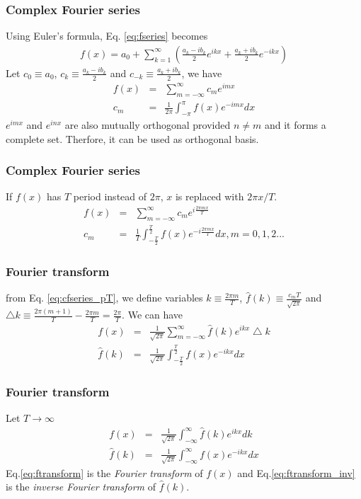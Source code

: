 \documentclass{beamer}
\begin{document}
\begin{frame}
\frametitle{Complex Fourier series}
Using Euler's formula, Eq. \ref{eq:fseries} becomes 
\begin{eqnarray}
f(x)=a_0 + \sum_{k=1}^{\infty} \left(\frac{a_k - ib_k}{2} e^{ikx} + \frac{a_k + ib_k}{2}e^{-ikx}\right) \nonumber
\end{eqnarray}
Let $c_0 \equiv a_0$, $c_k \equiv \frac{a_k - ib_k}{2}$ and $c_{-k} \equiv \frac{a_k + ib_k}{2}$, we have
\begin{eqnarray}
f(x)&=&\sum_{m=-\infty}^{\infty} c_m e^{imx} \nonumber \\
c_m&=&\frac{1}{2\pi}\int_{-\pi}^{\pi} f(x) e^{-imx} dx
\label{eq:cfseries}
\end{eqnarray}
$e^{imx}$ and $e^{inx}$ are also mutually orthogonal provided $n \neq m$ and it forms a complete set. Therfore, it can be used as orthogonal basis.\newline
\end{frame}
\begin{frame}
\frametitle{Complex Fourier series}
If $f(x)$ has $T$ period instead of $2\pi$, $x$ is replaced with $2\pi x /T$.
\begin{eqnarray}
f(x)&=&\sum_{m=-\infty}^{\infty} c_m e^{i\frac{2\pi mx}{T}} \nonumber \\
c_m&=&\frac{1}{T}\int_{-\frac{T}{2}}^{\frac{T}{2}} f(x) e^{-i\frac{2\pi mx}{T}} dx, m = 0,1,2...
\label{eq:cfseries_pT}
\end{eqnarray}
\end{frame}
\begin{frame}
\frametitle{Fourier transform}
from Eq. \ref{eq:cfseries_pT}, we define variables $k \equiv \frac{2\pi m}{T}$, $\hat{f}(k) \equiv\frac{c_mT}{\sqrt{2\pi}}$ and $ \bigtriangleup{k} \equiv \frac{2\pi (m+1)}{T} - \frac{2\pi m}{T} = \frac{2\pi}{T}$. \newline We can have
\begin{eqnarray}
f(x)&=&\frac{1}{\sqrt{2\pi}}\sum_{m=-\infty}^{\infty} \hat{f}(k) e^{ikx} \bigtriangleup{k} \nonumber \\
\hat{f}(k)&=&\frac{1}{\sqrt{2\pi}}\int_{-\frac{T}{2}}^{\frac{T}{2}} f(x) e^{-ikx}dx\nonumber
\end{eqnarray}
\end{frame}
\begin{frame}
\frametitle{Fourier transform}
Let $T\longrightarrow\infty$
\begin{eqnarray}
f(x)&=&\frac{1}{\sqrt{2\pi}}\int_{-\infty}^{\infty} \hat{f}(k) e^{ikx} dk
\label{eq:ftransform_inv}\\
\hat{f}(k)&=&\frac{1}{\sqrt{2\pi}}\int_{-\infty}^{\infty} f(x) e^{-ikx} dx
\label{eq:ftransform}
\end{eqnarray}
Eq.\ref{eq:ftransform} is the \emph{Fourier transform} of $f(x)$ and Eq.\ref{eq:ftransform_inv} is the \emph{inverse Fourier transform} of $\hat{f}(k)$.
\end{frame}
\end{document}
